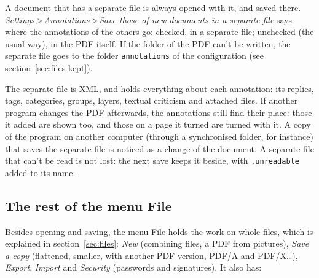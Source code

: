 \documentclass[12pt,
              article,
              oneside
              ]{memoir}
\newcommand*{\menu}[1]{\textit{#1}}
\newcommand*{\then}{\,>\,}
\begin{document}
%
A document that has a separate file is always opened with it, and saved
there. \menu{Settings\then Annotations\then Save those of new documents
in a separate file} says where the annotations of the others go: checked, in a
separate file; unchecked (the usual way), in the PDF itself. If the folder of the PDF can't be written, the separate
file goes to the folder \texttt{annotations} of the configuration (see
section~\ref{sec:files-kept}).

The separate file is XML, and holds everything about each annotation: its
replies, tags, categories, groups, layers, textual criticism and attached
files. If another program changes the PDF afterwards, the annotations
still find their place: those it added are shown too, and those on a page
it turned are turned with it. A copy of the program on another computer
(through a synchronised folder, for instance) that saves the separate file
is noticed as a change of the document. A separate file that can't be read
is not lost: the next save keeps it beside, with \texttt{.unreadable}
added to its name.

\subsection{The rest of the menu File}

%
Besides opening and saving, the menu File holds the work on whole files,
which is explained in section~\ref{sec:files}: \menu{New} (combining files,
a PDF from pictures), \menu{Save a copy} (flattened, smaller, with another
PDF version, PDF/A and PDF/X\ldots), \menu{Export}, \menu{Import} and
\menu{Security} (passwords and signatures). It also has:
\end{document}
